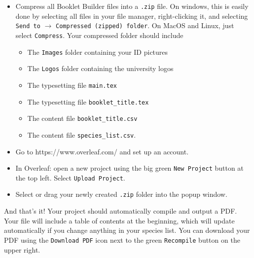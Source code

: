 \documentclass[a4paper,12pt,twoside]{article}
\begin{document}
            \begin{itemize}
                \item Compress all Booklet Builder files into a \texttt{.zip} file. On windows, this is easily done by selecting all files in your file manager, right-clicking it, and selecting \texttt{Send to} $\rightarrow$ \texttt{Compressed (zipped) folder}. On MacOS and Linux, just select \texttt{Compress}. Your compressed folder should include
                    \begin{itemize}
                        \item The \texttt{Images} folder containing your ID pictures
                        \item The \texttt{Logos} folder containing the university logos
                        \item The typesetting file \texttt{main.tex}
                        \item The typesetting file \texttt{booklet\_title.tex} 
                        \item The content file \texttt{booklet\_title.csv}
                        \item The content file \texttt{species\_list.csv}.
                    \end{itemize}
                \item Go to https://www.overleaf.com/ and set up an account.
                \item In Overleaf: open a new project using the big green \texttt{New Project} button at the top left. Select \texttt{Upload Project}.
                \item Select or drag your newly created \texttt{.zip} folder into the popup window.
            \end{itemize}
        And that's it! Your project should automatically compile and output a PDF. Your file will include a table of contents at the beginning, which will update automatically if you change anything in your species list. You can download your PDF using the \texttt{Download PDF} icon next to the green \texttt{Recompile} button on the upper right.
        
\end{document}
